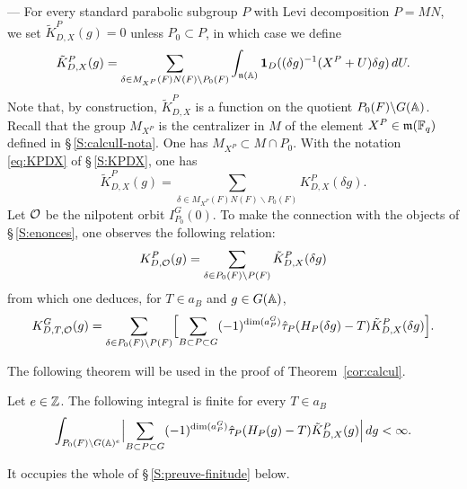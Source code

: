 \begin{paragr} ---\label{S:Ktilde}
For every standard parabolic subgroup $P$ with Levi decomposition $P=MN$, we set $\tilde{K}^P_{D,X}(g)=0$ unless $P_0\subset P$, in which case we define
\begin{equation}
  \label{eq:Ktilde}
  \tilde{K}^P_{D,X}(g)=\sum_{\delta\in M_{X^P}(F)N(F)\backslash P_0(F)} \int_{\mathfrak{n}(\mathbb{A})} \mathbf{1}_D((\delta g)^{-1}(X^P+U)\delta g)\, dU.
\end{equation}
Note that, by construction, $\tilde{K}^P_{D,X}$ is a function on the quotient $P_0(F)\backslash G(\mathbb{A})$. Recall that the group $M_{X^P}$ is the centralizer in $M$ of the element $X^P\in \mathfrak{m}(\mathbb{F}_q)$ defined in \S\,\ref{S:calculI-nota}. One has $M_{X^P}\subset M\cap P_0$. With the notation \eqref{eq:KPDX} of \S\,\ref{S:KPDX}, one has
\begin{equation}
  \label{eq:Ktilde2}
  \tilde{K}^P_{D,X}(g)=\sum_{\delta\in M_{X^P}(F)N(F)\backslash P_0(F)} K^P_{D,X}(\delta g).
\end{equation}
Let $\mathcal{O}$ be the nilpotent orbit $I^G_{P_0}(0)$. To make the connection with the objects of \S\,\ref{S:enonces}, one observes the following relation:
\begin{equation}
  \label{eq:KDO-Ktilde}
  K^P_{D,\mathcal{O}}(g)=\sum_{\delta\in P_0(F)\backslash P(F)} \tilde{K}^P_{D,X}(\delta g)
\end{equation}
from which one deduces, for $T\in a_B$ and $g\in G(\mathbb{A})$,
\begin{equation}
  \label{eq:KDTO-Ktilde}
  K^G_{D,T,\mathcal{O}}(g)=\sum_{\delta\in P_0(F)\backslash P(F)}\Bigl[\sum_{B\subset P\subset G} (-1)^{\dim(a_P^G)}\hat{\tau}_P(H_P(\delta g)-T)\tilde{K}^P_{D,X}(\delta g)\Bigr].
\end{equation}

The following theorem will be used in the proof of Theorem~\ref{cor:calcul}.

\begin{theoreme}\label{thm:finitude}
Let $e\in \mathbb{Z}$. The following integral is finite for every $T\in a_B$
$$\int_{P_0(F)\backslash G(\mathbb{A})^e}\Bigl|\sum_{B\subset P\subset G} (-1)^{\dim(a_P^G)}\hat{\tau}_P(H_P(g)-T)\tilde{K}^P_{D,X}(g)\Bigr|\, dg<\infty.$$
\end{theoreme}

\begin{preuve}
It occupies the whole of \S\,\ref{S:preuve-finitude} below.
\end{preuve}
\end{paragr}

